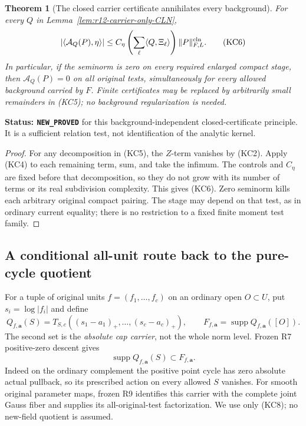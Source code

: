 \documentclass[11pt,a4paper]{article}
\numberwithin{equation}{section}
\newtheorem{theorem}{Theorem}[section]
\theoremstyle{definition}
\theoremstyle{remark}
\begin{document}
\begin{theorem}[The closed carrier certificate annihilates every background]
\label{thm:r12-carrier-cln-zero-certificate}
For every \(Q\) in Lemma~\ref{lem:r12-carrier-only-CLN},
\[
          |\langle\mathcal A_Q(P),\eta\rangle|
          \le C_\eta\left(\sum_\ell\langle Q,\Xi_\ell\rangle\right)
                                      \|P\|^{\rm cln}_{F,L}.
 \tag{KC6}
\]
In particular, if the seminorm is zero on every required enlarged
compact stage, then \(\mathcal A_Q(P)=0\) on all original tests,
simultaneously for every allowed background carried by \(F\).
Finite certificates may be replaced by arbitrarily small
remainders in (KC5); no background regularization is needed.
\end{theorem}

\noindent\textbf{Status: \texttt{NEW\_PROVED}} for this
background-independent closed-certificate principle. It is a
sufficient relation test, not identification of the analytic kernel.

\begin{proof}
For any decomposition in (KC5), the \(Z\)-term vanishes by (KC2).
Apply (KC4) to each remaining term, sum, and take the infimum.
The controls and \(C_\eta\) are fixed before that decomposition,
so they do not grow with its number of terms or its real
subdivision complexity. This gives (KC6). Zero seminorm kills
each arbitrary original compact pairing. The stage may depend
on that test, as in ordinary current equality; there is no
restriction to a fixed finite moment test family.
\end{proof}

\subsection{A conditional all-unit route back to the pure-cycle quotient}

For a tuple of original units \(f=(f_1,\ldots,f_c)\) on an
ordinary open \(O\subset U\), put \(s_i=\log|f_i|\) and define
\[
 Q_{f,\mathbf a}(S)
       =T_{S,c}((s_1-a_1)_+,\ldots,(s_c-a_c)_+),\qquad
 F_{f,\mathbf a}
       =\operatorname{supp}Q_{f,\mathbf a}([O]).
 \tag{KC7}
\]
The second set is the \emph{absolute cap carrier}, not the whole
norm level. Frozen R7 positive-zero descent gives
\[
                    \operatorname{supp}Q_{f,\mathbf a}(S)
                                            \subset F_{f,\mathbf a}.
 \tag{KC8}
\]
Indeed on the ordinary complement the positive point cycle has
zero absolute actual pullback, so its prescribed action on every
allowed \(S\) vanishes. For smooth original parameter maps,
frozen R9 identifies this carrier with the complete joint Gauss
fiber and supplies its all-original-test factorization. We use
only (KC8); no new-field quotient is assumed.
\end{document}
